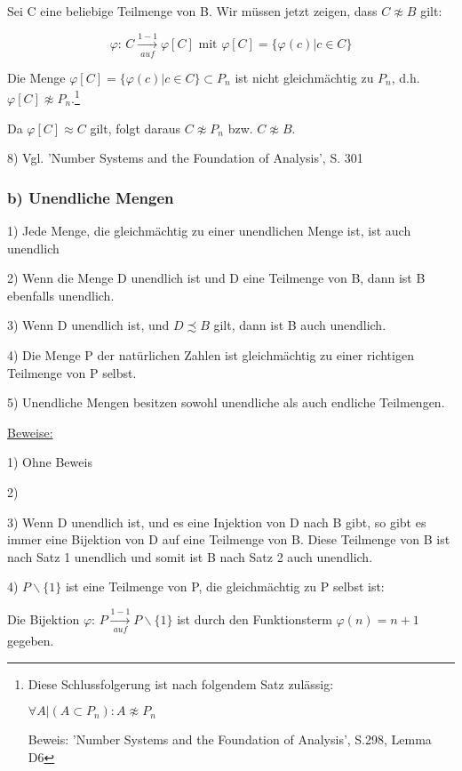 \documentclass[12pt]{article}
\begin{document}
		Sei C eine beliebige Teilmenge von B.
		Wir müssen jetzt zeigen, dass $C \not \approx B$ gilt:
		
		\[\varphi\text{: } C \xrightarrow[auf]{1-1} \varphi[C] \text{ mit } \varphi[C] = \{\varphi(c) | c \in C\}\]
		
		Die Menge $\varphi[C] = \{\varphi(c) | c \in C\} \subset P_n$ ist nicht gleichmächtig
		zu $P_n$, d.h. $\varphi[C] \not \approx P_n$.\footnote{
			Diese Schlussfolgerung ist nach folgendem Satz zulässig:
			
			$\forall A | (A \subset P_n): A \not \approx P_n$
			
			Beweis: 'Number Systems and the Foundation of Analysis', S.298, Lemma D6
		}
		
		Da $\varphi[C] \approx C$ gilt, folgt daraus $C \not \approx P_n$ bzw. $C \not \approx B$.
		
		8) Vgl. 'Number Systems and the Foundation of Analysis', S. 301
		
		\subsubsection*{b) Unendliche Mengen}
		
		1) Jede Menge, die gleichmächtig zu einer unendlichen Menge ist, ist auch unendlich
		
		2) Wenn die Menge D unendlich ist und D eine Teilmenge von B, dann ist B ebenfalls unendlich.
		
		3) Wenn D unendlich ist, und $D \precsim B$ gilt, dann ist B auch unendlich.
		
		4) Die Menge P der natürlichen Zahlen ist gleichmächtig zu einer richtigen Teilmenge von P selbst.
		
		5) Unendliche Mengen besitzen sowohl unendliche als auch endliche Teilmengen.
		
		\underline{Beweise:}
		
		1) Ohne Beweis
		
		2) %
		
		3) Wenn D unendlich ist, und es eine Injektion von D nach B gibt, so gibt es immer eine Bijektion 
		von D auf eine Teilmenge von B.
		Diese Teilmenge von B ist nach Satz 1 unendlich und somit ist B nach Satz 2 auch unendlich.
		
		4) $P \backslash \{1\}$ ist eine Teilmenge von P, die gleichmächtig zu P selbst ist:
		
		Die Bijektion $\varphi$: $P \xrightarrow[auf]{1-1} P \backslash \{1\}$ ist durch den Funktionsterm
		$\varphi(n) = n + 1$ gegeben.
		
\end{document}
